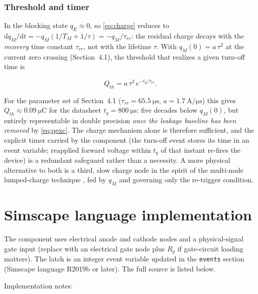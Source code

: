 \documentclass[11pt,a4paper]{article}
\begin{document}
\subsubsection*{Threshold and timer}

In the blocking state $q_E \approx 0$, so \eqref{eq:charge} reduces to
$\mathrm{d}q_M/\mathrm{d}t = -q_M(1/T_M + 1/\tau) = -q_M/\tau_{rr}$: the
residual charge decays with the \emph{recovery} time constant $\tau_{rr}$,
not with the lifetime $\tau$. With $q_M(0) = a\,\tau^2$ at the current zero
crossing (Section~4.1), the threshold that realizes a given turn-off time is

\begin{equation}
  Q_{th} = a\,\tau^2 \, e^{-t_q/\tau_{rr}}.
  \label{eq:tq}
\end{equation}

For the parameter set of Section~4.1 ($\tau_{rr} = \SI{65.5}{\micro\second}$,
$a = \SI{1.7}{\ampere\per\micro\second}$) this gives
$Q_{th} \approx \SI{0.09}{\micro\coulomb}$ for the datasheet
$t_q = \SI{800}{\micro\second}$: five decades below $q_M(0)$, but entirely
representable in double precision \emph{once the leakage baseline has been
removed} by \eqref{eq:qexc}. The charge mechanism alone is therefore
sufficient, and the explicit timer carried by the component (the turn-off
event stores its time in an event variable; reapplied forward voltage within
$t_q$ of that instant re-fires the device) is a redundant safeguard rather
than a necessity. A more physical alternative to both is a third, slow
charge node in the spirit of the multi-node lumped-charge technique
\cite{ma1997}, fed by $q_M$ and governing only the re-trigger condition.

\section{Simscape language implementation}

The component uses electrical anode and cathode nodes and a physical-signal
gate input (replace with an electrical gate node plus $R_g$ if gate-circuit
loading matters). The latch is an integer event variable updated in the
\texttt{events} section (Simscape language R2019b or later). The full source
is listed below.



Implementation notes:
\end{document}
